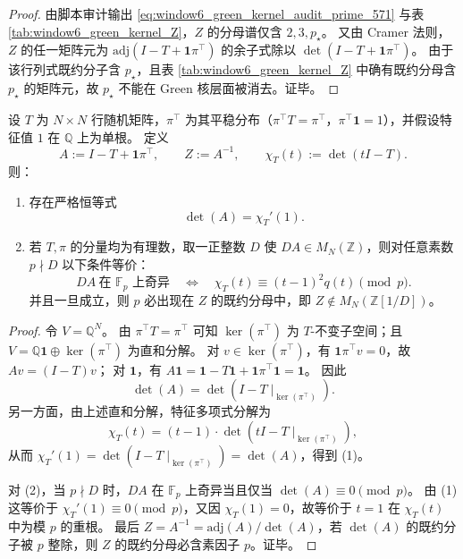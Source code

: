 \begin{proof}
由脚本审计输出 \eqref{eq:window6_green_kernel_audit_prime_571} 与表 \ref{tab:window6_green_kernel_Z}，\(Z\) 的分母谱仅含 \(2,3,p_\star\)。
又由 Cramer 法则，\(Z\) 的任一矩阵元为 \(\mathrm{adj}(I-T+\mathbf 1\pi^\top)\) 的余子式除以 \(\det(I-T+\mathbf 1\pi^\top)\)。
由于该行列式既约分子含 \(p_\star\)，且表 \ref{tab:window6_green_kernel_Z} 中确有既约分母含 \(p_\star\) 的矩阵元，故 \(p_\star\) 不能在 Green 核层面被消去。证毕。
\end{proof}

\begin{theorem}\label{thm:xi-markov-derivative-determinant-bad-prime}
设 \(T\) 为 \(N\times N\) 行随机矩阵，\(\pi^\top\) 为其平稳分布（\(\pi^\top T=\pi^\top\)，\(\pi^\top\mathbf 1=1\)），并假设特征值 \(1\) 在 \(\mathbb Q\) 上为单根。
定义
\[
A:=I-T+\mathbf 1\pi^\top,\qquad Z:=A^{-1},
\qquad
\chi_T(t):=\det(tI-T).
\]
则：
\begin{enumerate}
  \item 存在严格恒等式
  \[
  \det(A)=\chi_T'(1).
  \]
  \item 若 \(T,\pi\) 的分量均为有理数，取一正整数 \(D\) 使 \(DA\in M_N(\mathbb Z)\)，则对任意素数 \(p\nmid D\) 以下条件等价：
  \[
  DA\ \text{在 }\mathbb F_p\text{ 上奇异}
  \quad\Longleftrightarrow\quad
  \chi_T(t)\equiv (t-1)^2q(t)\pmod p.
  \]
  并且一旦成立，则 \(p\) 必出现在 \(Z\) 的既约分母中，即 \(Z\notin M_N(\mathbb Z[1/D])\)。
\end{enumerate}
\end{theorem}
\begin{proof}
令 \(V=\mathbb Q^N\)。
由 \(\pi^\top T=\pi^\top\) 可知 \(\ker(\pi^\top)\) 为 \(T\)-不变子空间；且 \(V=\mathbb Q\mathbf 1\oplus \ker(\pi^\top)\) 为直和分解。
对 \(v\in \ker(\pi^\top)\)，有 \(\mathbf 1\pi^\top v=0\)，故 \(Av=(I-T)v\)；
对 \(\mathbf 1\)，有 \(A\mathbf 1=\mathbf 1-T\mathbf 1+\mathbf 1\pi^\top\mathbf 1=\mathbf 1\)。
因此
\[
\det(A)=\det(I-T\mid_{\ker(\pi^\top)}).
\]
另一方面，由上述直和分解，特征多项式分解为
\[
\chi_T(t)=(t-1)\cdot \det(tI-T\mid_{\ker(\pi^\top)}),
\]
从而
\(
\chi_T'(1)=\det(I-T\mid_{\ker(\pi^\top)})=\det(A)
\)，得到 (1)。
\par
对 (2)，当 \(p\nmid D\) 时，\(DA\) 在 \(\mathbb F_p\) 上奇异当且仅当 \(\det(A)\equiv 0\pmod p\)。
由 (1) 这等价于 \(\chi_T'(1)\equiv 0\pmod p\)，又因 \(\chi_T(1)=0\)，故等价于 \(t=1\) 在 \(\chi_T(t)\) 中为模 \(p\) 的重根。
最后 \(Z=A^{-1}=\mathrm{adj}(A)/\det(A)\)，若 \(\det(A)\) 的既约分子被 \(p\) 整除，则 \(Z\) 的既约分母必含素因子 \(p\)。证毕。
\end{proof}

